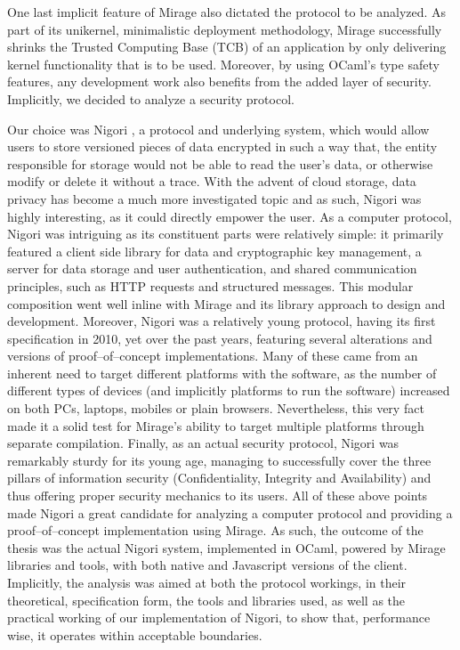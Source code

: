 One last implicit feature of Mirage also dictated the protocol to be analyzed.
As part of its unikernel, minimalistic deployment methodology, Mirage successfully shrinks the Trusted Computing Base (TCB) of an application by only delivering kernel functionality that is to be used.
Moreover, by using OCaml's type safety features, any development work also benefits from the added layer of security.
Implicitly, we decided to analyze a security protocol.

Our choice was Nigori \cite{NigoriDraft}, a protocol and underlying system, which would allow users to store versioned pieces of data encrypted in such a way that, the entity responsible for storage would not be able to read the user's data, or otherwise modify or delete it without a trace.
With the advent of cloud storage, data privacy has become a much more investigated topic and as such, Nigori was highly interesting, as it could directly empower the user.
As a computer protocol, Nigori was intriguing as its constituent parts were relatively simple: it primarily featured a client side library for data and cryptographic key management, a server for data storage and user authentication, and shared communication principles, such as HTTP requests and structured messages.
This modular composition went well inline with Mirage and its library approach to design and development.
Moreover, Nigori was a relatively young protocol, having its first specification in 2010, yet over the past years, featuring several alterations and versions of proof--of--concept implementations.
Many of these came from an inherent need to target different platforms with the software, as the number of different types of devices (and implicitly platforms to run the software) increased on both PCs, laptops, mobiles or plain browsers.
Nevertheless, this very fact made it a solid test for Mirage's ability to target multiple platforms through separate compilation.
Finally, as an actual security protocol, Nigori was remarkably sturdy for its young age, managing to successfully cover the three pillars of information security (Confidentiality, Integrity and Availability) and thus offering proper security mechanics to its users.
All of these above points made Nigori a great candidate for analyzing a computer protocol and providing a proof--of--concept implementation using Mirage.
As such, the outcome of the thesis was the actual Nigori system, implemented in OCaml, powered by Mirage libraries and tools, with both native and Javascript versions of the client.
Implicitly, the analysis was aimed at both the protocol workings, in their theoretical, specification form, the tools and libraries used, as well as the practical working of our implementation of Nigori, to show that, performance wise, it operates within acceptable boundaries.

